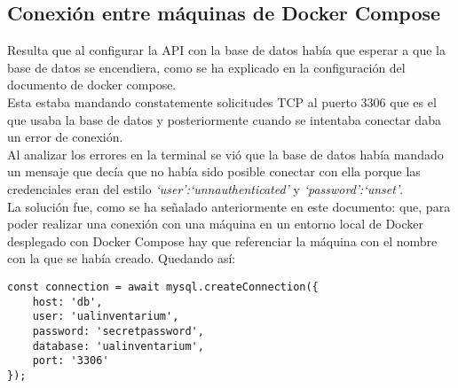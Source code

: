 \subsection{Conexión entre máquinas de Docker Compose}
Resulta que al configurar la API con la base de datos había que esperar a que la base de datos se encendiera, como se ha explicado en la configuración del documento de docker compose.
\\Esta estaba mandando constatemente solicitudes TCP al puerto 3306 que es el que usaba la base de datos y posteriormente cuando se intentaba conectar daba un error de conexión.
\\Al analizar los errores en la terminal se vió que la base de datos había mandado un mensaje que decía que no había sido posible conectar con ella porque las credenciales eran del estilo \textit{`user':`unnauthenticated'} y \textit{`password':`unset'}.
\\La solución fue, como se ha señalado anteriormente en este documento: que, para poder realizar una conexión con una máquina en un entorno local de Docker desplegado con Docker Compose hay que referenciar la máquina con el nombre con la que se había creado. Quedando así:
\begin{verbatim}
const connection = await mysql.createConnection({
    host: 'db',
    user: 'ualinventarium',
    password: 'secretpassword',
    database: 'ualinventarium',
    port: '3306'
});
\end{verbatim}
